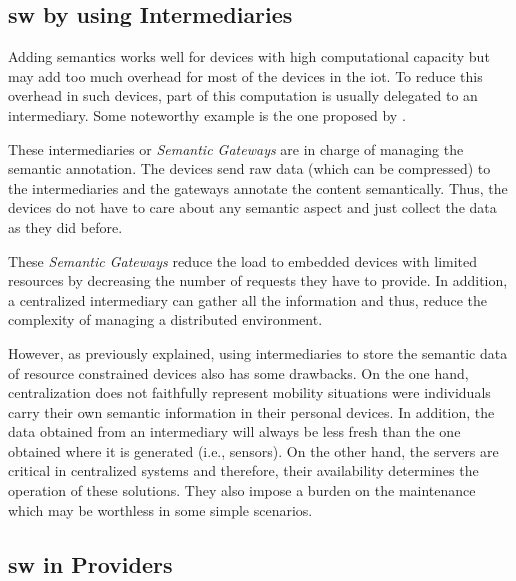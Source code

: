 \subsection{\acs{sw} by using Intermediaries}




Adding semantics works well for devices with high computational capacity but may add too much overhead for most of the devices in the \ac{iot}.
To reduce this overhead in such devices, part of this computation is usually delegated to an intermediary.
Some noteworthy example is the one proposed by \citet{broring_semantic_2009}.

These intermediaries or \emph{Semantic Gateways} are in charge of managing the semantic annotation.
The devices send raw data (which can be compressed) to the intermediaries and the gateways annotate the content semantically.
Thus, the devices do not have to care about any semantic aspect and just collect the data as they did before.

These \emph{Semantic Gateways} reduce the load to embedded devices with limited resources by decreasing the number of requests they have to provide.
In addition, a centralized intermediary can gather all the information and thus, reduce the complexity of managing a distributed environment.

However, as previously explained, using intermediaries to store the semantic data of resource constrained devices also has some drawbacks.
On the one hand, centralization does not faithfully represent mobility situations were individuals carry their own semantic information in their personal devices.
In addition, the data obtained from an intermediary will always be less fresh than the one obtained where it is generated (i.e., sensors).
On the other hand, the servers are critical in centralized systems and therefore, their availability determines the operation of these solutions.
They also impose a burden on the maintenance which may be worthless in some simple scenarios.



\subsection{\acs{sw} in Providers}

